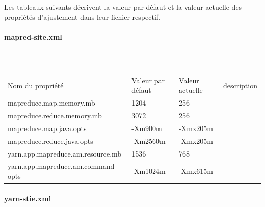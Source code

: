 \documentclass[12pt,french]{book}
\begin{document}
Les tableaux suivants décrivent la valeur par défaut et la valeur actuelle des propriétés d’ajustement dans leur fichier respectif. 

\paragraph{mapred-site.xml}\mbox{}\\

\begin{table}[H]
\begin{tabular}{llll}
\rowcolor[HTML]{4472C4} 
{\color[HTML]{FFFFFF} Nom du propriété} & {\color[HTML]{FFFFFF} Valeur par défaut} & {\color[HTML]{FFFFFF} Valeur actuelle} & {\color[HTML]{FFFFFF} description} \\
\rowcolor[HTML]{D9E2F3} 
mapreduce.map.memory.mb                 & 1204                                     & 256                                    &                                    \\
mapreduce.reduce.memory.mb              & 3072                                     & 256                                    &                                    \\
\rowcolor[HTML]{D9E2F3} 
mapreduce.map.java.opts                 & -Xm900m                                  & -Xmx205m                               &                                    \\
mapreduce.reduce.java.opts              & -Xm2560m                                 & -Xmx205m                               &                                    \\
\rowcolor[HTML]{D9E2F3} 
yarn.app.mapreduce.am.resource.mb       & 1536                                     & 768                                    &                                    \\
yarn.app.mapreduce.am.command-opts      & -Xm1024m                                 & -Xmx615m                               &                                   
\end{tabular}
\caption{}
\end{table}

\paragraph{yarn-stie.xml}\mbox{}\\
\end{document}
